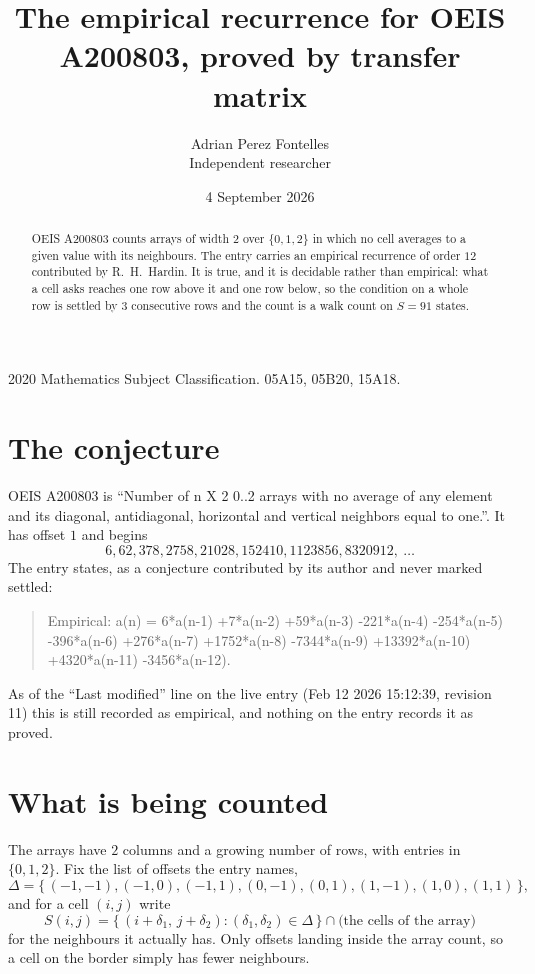 \documentclass[11pt,a4paper]{article}
\title{The empirical recurrence for OEIS A200803, proved by transfer matrix}
\author{Adrian Perez Fontelles\\ \small Independent researcher}
\date{4 September 2026}
\theoremstyle{plain}
\theoremstyle{definition}
\begin{document}
\maketitle

\begin{abstract}
OEIS A200803 counts arrays of width $2$ over $\{0,1,2\}$ in which no cell averages to a given value with its neighbours. The entry carries an
empirical recurrence of order $12$ contributed by R.~H.~Hardin. It is true, and it is
decidable rather than empirical: what a cell asks reaches one row above
it and one row below, so the condition on a whole row is settled by
$3$ consecutive rows and the count is a walk count on $S=91$ states.
\end{abstract}

\noindent\small 2020 Mathematics Subject Classification. 05A15, 05B20, 15A18.\normalsize

\section{The conjecture}

OEIS A200803 is ``Number of n X 2 0..2 arrays with no average of any element and its diagonal, antidiagonal, horizontal and vertical neighbors equal to one.''. It has offset $1$ and begins
\[
6, 62, 378, 2758, 21028, 152410, 1123856, 8320912,\ \dots
\]
The entry states, as a conjecture contributed by its author and never marked settled:
\begin{quote}
Empirical: a(n) = 6*a(n-1) +7*a(n-2) +59*a(n-3) -221*a(n-4) -254*a(n-5) -396*a(n-6) +276*a(n-7) +1752*a(n-8) -7344*a(n-9) +13392*a(n-10) +4320*a(n-11) -3456*a(n-12).
\end{quote}
As of the ``Last modified'' line on the live entry (Feb 12 2026 15:12:39, revision 11) this is still
recorded as empirical, and nothing on the entry records it as proved.

\section{What is being counted}

The arrays have $2$ columns and a growing number of rows, with entries in $\{0,1,2\}$. Fix the
list of offsets the entry names,
\[
\Delta=\{\,(-1,-1), (-1,0), (-1,1), (0,-1), (0,1), (1,-1), (1,0), (1,1)\,\},
\]
and for a cell $(i,j)$ write
\[
S(i,j)=\{\,(i+\delta_1,\,j+\delta_2) : (\delta_1,\delta_2)\in\Delta\,\}\cap
\text{(the cells of the array)}
\]
for the neighbours it actually has. Only offsets landing inside the array count, so a cell on
the border simply has fewer neighbours.
\end{document}
